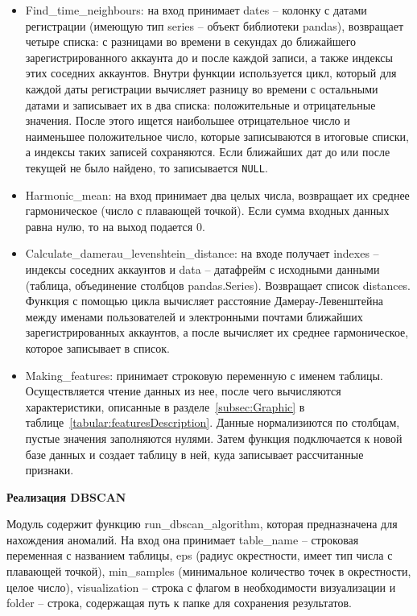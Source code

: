 \begin{itemize}[itemindent=2cm, leftmargin=0cm, labelsep=0.3cm, topsep=0cm, itemsep=0cm, parsep=0cm, before=\vspace{-0.15cm}, after=\vspace{-0.15cm}]
    \item Find\_time\_neighbours: на вход принимает dates -- колонку с датами регистрации (имеющую тип series -- объект библиотеки pandas), возвращает четыре списка: с разницами во времени в секундах до ближайшего зарегистрированного аккаунта до и после каждой записи, а также индексы этих соседних аккаунтов. Внутри функции используется цикл, который для каждой даты регистрации вычисляет разницу во времени с остальными датами и записывает их в два списка: положительные и отрицательные значения. После этого ищется наибольшее отрицательное число и наименьшее положительное число, которые записываются в итоговые списки, а индексы таких записей сохраняются. Если ближайших дат до или после текущей не было найдено, то записывается \texttt{NULL}.
    \item Harmonic\_mean: на вход принимает два целых числа, возвращает их среднее гармоническое (число с плавающей точкой). Если сумма входных данных равна нулю, то на выход подается 0.
    \item Calculate\_damerau\_levenshtein\_distance: на входе получает indexes -- индексы соседних аккаунтов и data -- датафрейм с исходными данными (таблица, объединение столбцов pandas.Series). Возвращает список distances. Функция с помощью цикла вычисляет расстояние Дамерау-Левенштейна~\cite{Damerau64} между именами пользователей и электронными почтами ближайших зарегистрированных аккаунтов, а после вычисляет их среднее гармоническое, которое записывает в список.
    \item Making\_features: принимает строковую переменную с именем таблицы. Осуществляется чтение данных из нее, после чего вычисляются характеристики, описанные в разделе~\ref{subsec:Graphic} в таблице~\ref{tabular:featuresDescription}. Данные нормализиются по столбцам, пустые значения заполняются нулями. Затем функция подключается к новой базе данных и создает таблицу в ней, куда записывает рассчитанные признаки.
\end{itemize}

\textbf{Реализация DBSCAN}

Модуль содержит функцию run\_dbscan\_algorithm, которая предназначена для нахождения аномалий. На вход она принимает table\_name -- строковая переменная с названием таблицы, eps (радиус окрестности, имеет тип числа с плавающей точкой), min\_samples (минимальное количество точек в окрестности, целое число), visualization -- строка с флагом в необходимости визуализации и folder -- строка, содержащая путь к папке для сохранения результатов.

